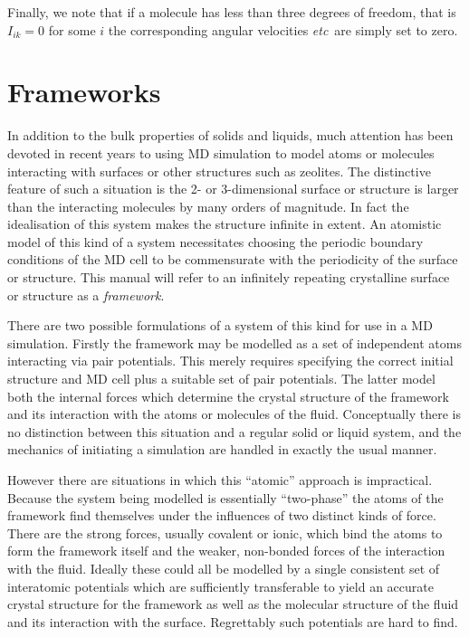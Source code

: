 \documentclass[twoside]{report}
\newcommand{\etc}{{\em etc}}
\begin{document}
Finally, we note that if a molecule has less than three degrees of
freedom, that is $I_{ik}=0$ for some $i$ the corresponding angular
velocities \etc\ are simply set to zero.

\section{Frameworks}%
\label{sec:frameworks}
In addition to the bulk properties of solids and liquids, much
attention has been devoted in recent years to using MD simulation to
model atoms or molecules interacting with surfaces or other structures
such as zeolites.  The distinctive feature of such a situation is the
2- or 3-dimensional surface or structure is larger than the
interacting molecules by many orders of magnitude.  In fact the
idealisation of this system makes the structure infinite in extent.
An atomistic model of this kind of a system necessitates choosing the
periodic boundary conditions of the MD cell to be commensurate with
the periodicity of the surface or structure.  This manual will refer
to an infinitely repeating crystalline surface or structure as a {\em
framework}.

There are two possible formulations of a system of this kind for use
in a MD simulation.  Firstly the framework may be modelled as a set of
independent atoms interacting via pair potentials.  This merely
requires specifying the correct initial structure and MD cell plus a
suitable set of pair potentials. The latter model both the internal
forces which determine the crystal structure of the framework and its
interaction with the atoms or molecules of the fluid.  Conceptually
there is no distinction between this situation and a regular solid or
liquid system, and the mechanics of initiating a simulation are
handled in exactly the usual manner.

However there are situations in which this ``atomic'' approach is
impractical.  Because the system being modelled is essentially
``two-phase'' the atoms of the framework find themselves under the
influences of two distinct kinds of force.  There are the strong
forces, usually covalent or ionic, which bind the atoms to form the
framework itself and the weaker, non-bonded forces of the interaction
with the fluid.  Ideally these could all be modelled by a single
consistent set of interatomic potentials which are sufficiently
transferable to yield an accurate crystal structure for the framework
as well as the molecular structure of the fluid and its interaction
with the surface.  Regrettably such potentials are hard to find.
\end{document}
